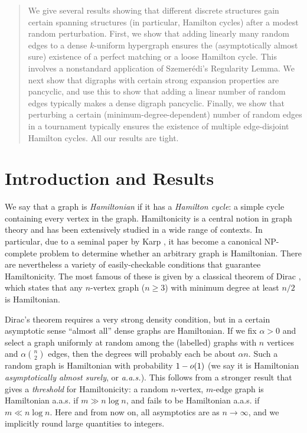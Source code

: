 \documentclass[11pt,english]{article}
\theoremstyle{plain}
\theoremstyle{definition}
\theoremstyle{definition}
\theoremstyle{plain}
\theoremstyle{plain}
\theoremstyle{plain}
\theoremstyle{plain}
\theoremstyle{remark}
\theoremstyle{remark}
\let\originalleft\left
\let\originalright\right
\renewcommand{\left}{\mathopen{}\mathclose\bgroup\originalleft}
\renewcommand{\right}{\aftergroup\egroup\originalright}
\begin{document}
\begin{abstract}
We give several results showing that different discrete structures
gain certain spanning structures (in particular, Hamilton cycles) after a modest random perturbation. First, we show
that adding linearly many random edges to a dense $k$-uniform hypergraph ensures
the (asymptotically almost sure) existence of a perfect matching or a loose
Hamilton cycle. This involves a nonstandard application of Szemer\'edi's
Regularity Lemma. We next show that digraphs with certain strong expansion
properties are pancyclic, and use this to show that adding a linear
number of random edges typically makes a dense digraph pancyclic. Finally, we
show that perturbing a certain (minimum-degree-dependent) number of
random edges in a tournament typically ensures the existence of multiple edge-disjoint
Hamilton cycles. All our results are tight.
\end{abstract}

\section{Introduction and Results}

We say that a graph is \emph{Hamiltonian} if it has a \emph{Hamilton
cycle}: a simple cycle containing every vertex in the graph. Hamiltonicity
is a central notion in graph theory and has been extensively studied
in a wide range of contexts. In particular, due to a seminal paper
by Karp \cite{Kar72}, it has become a canonical NP-complete problem
to determine whether an arbitrary graph is Hamiltonian. There are
nevertheless a variety of easily-checkable conditions that guarantee
Hamiltonicity. The most famous of these is given by a classical theorem
of Dirac \cite{Dir52}, which states that any $n$-vertex graph ($n\ge 3$) with
minimum degree at least $n/2$ is Hamiltonian.

Dirac's theorem requires a very strong density condition, but in a
certain asymptotic sense ``almost all'' dense graphs are Hamiltonian.
If we fix $\alpha>0$ and select a graph uniformly at random among
the (labelled) graphs with $n$ vertices and $\alpha{n \choose 2}$
edges, then the degrees will probably each be about $\alpha n$. Such
a random graph is Hamiltonian with probability $1-o\left(1\right)$
(we say it is Hamiltonian \emph{asymptotically almost surely}, or
\emph{a.a.s.}). This follows from a stronger result \cite{Pos76}
that gives a \emph{threshold} for Hamiltonicity: a random $n$-vertex,
$m$-edge graph is Hamiltonian a.a.s. if $m\gg n\log n$, and fails
to be Hamiltonian a.a.s. if $m\ll n\log n$. Here and from now on,
all asymptotics are as $n\to\infty$, and we implicitly round large
quantities to integers.
\end{document}
